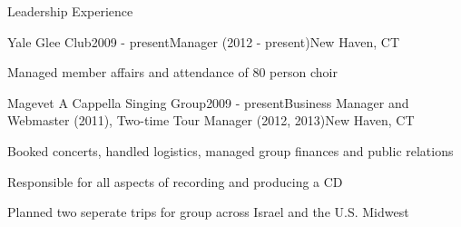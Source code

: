 \documentclass{resume} %
\begin{document}

\begin{rSection}{Leadership Experience}

\begin{rSubsection}{Yale Glee Club}{2009 - present}{Manager (2012 - present)}{New Haven, CT}
\item Managed member affairs and attendance of 80 person choir
\end{rSubsection}


\begin{rSubsection}{Magevet A Cappella Singing Group}{2009 - present}{Business Manager and Webmaster (2011), Two-time Tour Manager (2012, 2013)}{New Haven, CT}
\item Booked concerts, handled logistics, managed group finances and public relations
\item Responsible for all aspects of recording and producing a CD
\item Planned two seperate trips for group across Israel and the U.S. Midwest
\end{rSubsection}

\end{rSection}
\end{document}
